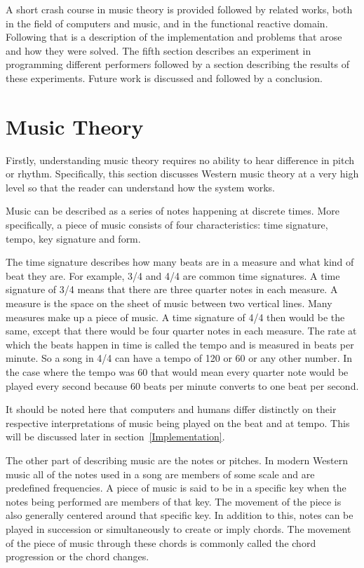 \documentclass[12pt]{ucthesis}
\begin{document}
A short crash course in music theory is provided followed by related works, both in the field of computers and music, and in the functional reactive domain. Following that is a description of the implementation and problems that arose and how they were solved. The fifth section describes an experiment in programming different performers followed by a section describing the results of these experiments. Future work is discussed and followed by a conclusion.

\chapter{Music Theory}
\label{music-theory}

Firstly, understanding music theory requires no ability to hear difference in pitch or rhythm. Specifically, this section discusses Western music theory at a very high level so that the reader can understand how the system works. 

Music can be described as a series of notes happening at discrete times. More specifically, a piece of music consists of four characteristics: time signature, tempo, key signature and form.

The time signature describes how many beats are in a measure and what kind of beat they are. For example, 3/4 and 4/4 are common time signatures. A time signature of 3/4 means that there are three quarter notes in each measure. A measure is the space on the sheet of music between two vertical lines. Many measures make up a piece of music. A time signature of 4/4 then would be the same, except that there would be four quarter notes in each measure. The rate at which the beats happen in time is called the tempo and is measured in beats per minute. So a song in 4/4 can have a tempo of 120 or 60 or any other number. In the case where the tempo was 60 that would mean every quarter note would be played every second because 60 beats per minute converts to one beat per second. 

It should be noted here that computers and humans differ distinctly on their respective interpretations of music being played on the beat and at tempo. This will be discussed later in section~\ref{Implementation}.

The other part of describing music are the notes or pitches. In modern Western music all of the notes used in a song are members of some scale and are predefined frequencies. A piece of music is said to be in a specific key when the notes being performed are members of that key. The movement of the piece is also generally centered around that specific key. In addition to this, notes can be played in succession or simultaneously to create or imply chords. The movement of the piece of music through these chords is commonly called the chord progression or the chord changes. 
\end{document}
